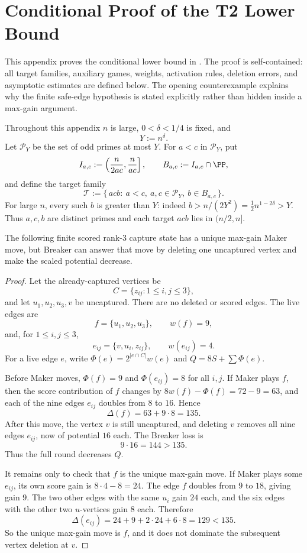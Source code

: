 \section{Conditional Proof of the T2 Lower Bound}\label{app:t2-proof}

This appendix proves the conditional lower bound in .  The proof
is self-contained: all target families, auxiliary games, weights, activation
rules, deletion errors, and asymptotic estimates are defined below.  The
opening counterexample explains why the finite safe-edge hypothesis is stated
explicitly rather than hidden inside a max-gain argument.

Throughout this appendix $n$ is large, $0<\delta<1/4$ is fixed, and
\[
  Y:=n^\delta.
\]
Let $\mathcal P_Y$ be the set of odd primes at most $Y$.  For
$a<c$ in $\mathcal P_Y$, put
\[
  I_{a,c}:=\left(\frac{n}{2ac},\frac{n}{ac}\right],
  \qquad
  B_{a,c}:=I_{a,c}\cap\PP,
\]
and define the target family
\[
  \mathcal T
  :=
  \{\,acb:\ a<c,\ a,c\in\mathcal P_Y,\ b\in B_{a,c}\,\}.
\]
For large $n$, every such $b$ is greater than $Y$: indeed
$b>n/(2Y^2)=\frac12 n^{1-2\delta}>Y$.  Thus $a,c,b$ are distinct primes and
each target $acb$ lies in $(n/2,n]$.

\begin{proposition}
\label{prop:t2-max-gain-counterexample}
The following finite scored rank-$3$ capture state has a unique max-gain Maker
move, but Breaker can answer that move by deleting one uncaptured vertex and
make the scaled potential decrease.
\end{proposition}

\begin{proof}
Let the already-captured vertices be
\[
  C=\{z_{ij}:1\le i,j\le 3\},
\]
and let $u_1,u_2,u_3,v$ be uncaptured.  There are no deleted or scored edges.
The live edges are
\[
  f=\{u_1,u_2,u_3\},\qquad w(f)=9,
\]
and, for $1\le i,j\le 3$,
\[
  e_{ij}=\{v,u_i,z_{ij}\},\qquad w(e_{ij})=4.
\]
For a live edge $e$, write $\Phi(e)=2^{|e\cap C|}w(e)$ and
$Q=8S+\sum\Phi(e)$.

Before Maker moves, $\Phi(f)=9$ and $\Phi(e_{ij})=8$ for all $i,j$.  If Maker
plays $f$, then the score contribution of $f$ changes by
$8w(f)-\Phi(f)=72-9=63$, and each of the nine edges $e_{ij}$ doubles from
$8$ to $16$.  Hence
\[
  \Delta(f)=63+9\cdot 8=135.
\]
After this move, the vertex $v$ is still uncaptured, and deleting $v$ removes
all nine edges $e_{ij}$, now of potential $16$ each.  The Breaker loss is
\[
  9\cdot 16=144>135.
\]
Thus the full round decreases $Q$.

It remains only to check that $f$ is the unique max-gain move.  If Maker plays
some $e_{ij}$, its own score gain is $8\cdot4-8=24$.  The edge $f$ doubles
from $9$ to $18$, giving gain $9$.  The two other edges with the same $u_i$
gain $24$ each, and the six edges with the other two $u$-vertices gain $8$
each.  Therefore
\[
  \Delta(e_{ij})=24+9+2\cdot24+6\cdot8=129<135.
\]
So the unique max-gain move is $f$, and it does not dominate the subsequent
vertex deletion at $v$.
\end{proof}

